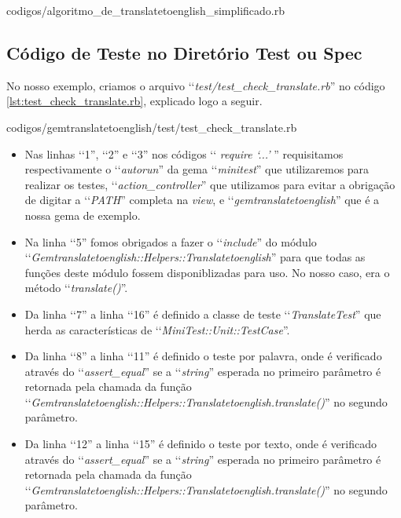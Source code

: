 
{codigos/algoritmo_de_translatetoenglish_simplificado.rb}


\subsection{Código de Teste no Diretório Test ou Spec}
\label{subsection:codigo_de_teste_no_diretorio_test_ou_spec}


No nosso exemplo, criamos o arquivo ‘‘\emph{test/test\_check\_translate.rb}'' no código
\ref{lst:test_check_translate.rb}, explicado logo a seguir.


{codigos/gemtranslatetoenglish/test/test_check_translate.rb}

\begin{itemize}

 \item Nas linhas ‘‘1'', ‘‘2'' e ‘‘3'' nos códigos ‘‘ \emph{require ‘...'} '' requisitamos respectivamente o
 ‘‘\emph{autorun}'' da gema ‘‘\emph{minitest}'' que utilizaremos para realizar os testes,
 ‘‘\emph{action\_controller}'' que utilizamos para evitar a obrigação de digitar a ‘‘\emph{PATH}'' completa
 na \emph{view}, e ‘‘\emph{gemtranslatetoenglish}'' que é a nossa gema de exemplo.

 \item Na linha ‘‘5'' fomos obrigados a fazer o ‘‘\emph{include}'' do módulo
 ‘‘\emph{Gemtranslatetoenglish::Helpers::Translatetoenglish}'' para que todas as funções deste módulo fossem
 disponiblizadas para uso. No nosso caso, era o método ‘‘\emph{translate()}''.

 \item Da linha ‘‘7'' a linha ‘‘16'' é definido a classe de teste ‘‘\emph{TranslateTest}'' que herda as
 características de ‘‘\emph{MiniTest::Unit::TestCase}''.

 \item Da linha ‘‘8'' a linha ‘‘11'' é definido o teste por palavra, onde é verificado através do
 ‘‘\emph{assert\_equal}'' se a ‘‘\emph{string}'' esperada no primeiro parâmetro é retornada pela chamada
 da função ‘‘\emph{Gemtranslatetoenglish::Helpers::Translatetoenglish.translate()}'' no segundo parâmetro.

 \item Da linha ‘‘12'' a linha ‘‘15'' é definido o teste por texto, onde é verificado através do
 ‘‘\emph{assert\_equal}'' se a ‘‘\emph{string}'' esperada no primeiro parâmetro é retornada pela chamada
 da função ‘‘\emph{Gemtranslatetoenglish::Helpers::Translatetoenglish.translate()}'' no segundo parâmetro.

\end{itemize}


